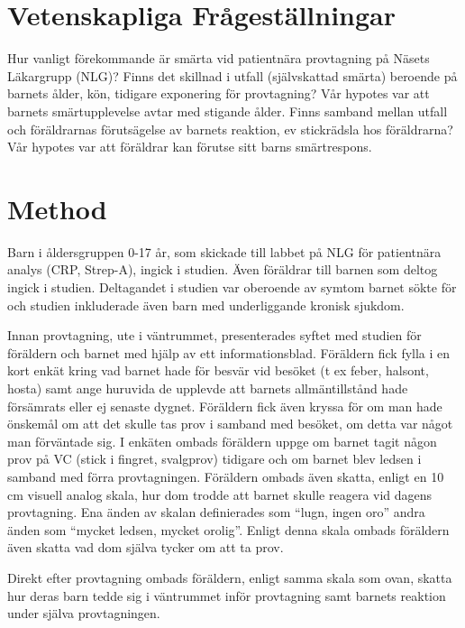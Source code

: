 \documentclass[12pt,twocolumn]{article}
\begin{document}
\section{Vetenskapliga Fr\r{a}gest\"allningar}

Hur vanligt f\"orekommande \"ar sm\"arta vid patientn\"ara provtagning p\r{a}
N\"asets L\"akargrupp (NLG)?
Finns det skillnad i utfall (sj\"alvskattad sm\"arta) beroende p\r{a} barnets
\r{a}lder, k\"on, tidigare exponering f\"or provtagning? V\r{a}r hypotes var att
barnets sm\"artupplevelse avtar med stigande \r{a}lder.
Finns samband mellan utfall och f\"or\"aldrarnas f\"oruts\"agelse av barnets
reaktion, ev stickr\"adsla hos f\"or\"aldrarna? V\r{a}r hypotes var att
f\"or\"aldrar kan f\"orutse sitt barns sm\"artrespons.

\section{Method}

Barn i \r{a}ldersgruppen 0-17 \r{a}r, som skickade till labbet p\r{a} NLG f\"or
patientn\"ara analys (CRP, Strep-A), ingick i studien. \"Aven f\"or\"aldrar till
barnen som deltog ingick i studien. Deltagandet i studien var oberoende av
symtom barnet s\"okte f\"or och studien inkluderade \"aven barn med
underliggande kronisk sjukdom.

Innan provtagning, ute i v\"antrummet, presenterades syftet med studien f\"or
f\"or\"aldern och barnet med hj\"alp av ett informationsblad. F\"or\"aldern fick
fylla i en kort enk\"at kring vad barnet hade f\"or besv\"ar vid bes\"oket (t ex
feber, halsont, hosta) samt ange huruvida de upplevde att barnets
allm\"antillst\r{a}nd hade f\"ors\"amrats eller ej senaste dygnet. F\"or\"aldern
fick \"aven kryssa f\"or om man hade \"onskem\r{a}l om att det skulle tas prov i
samband med bes\"oket, om detta var n\r{a}got man f\"orv\"antade sig. I
enk\"aten ombads f\"or\"aldern uppge om barnet tagit n\r{a}gon prov p\r{a} VC
(stick i fingret, svalgprov) tidigare och om barnet blev ledsen i samband med
f\"orra provtagningen. F\"or\"aldern ombads \"aven skatta, enligt en 10 cm
visuell analog skala, hur dom trodde att barnet skulle reagera vid dagens
provtagning.
Ena \"anden av skalan definierades som “lugn, ingen oro” andra \"anden som
“mycket ledsen, mycket orolig”. Enligt denna skala ombads f\"or\"aldern \"aven
skatta vad dom sj\"alva tycker om att ta prov.

Direkt efter provtagning ombads f\"or\"aldern, enligt samma skala som ovan,
skatta hur deras barn tedde sig i v\"antrummet inf\"or provtagning samt barnets
reaktion under sj\"alva provtagningen.
\end{document}
